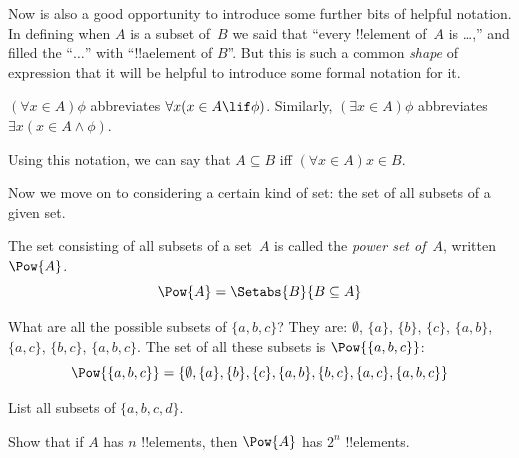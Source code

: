 \documentclass[../../../include/open-logic-section]{subfiles}
\begin{document}
Now is also a good opportunity to introduce some further bits of
helpful notation. In defining when $A$ is a subset of~$B$ we said that
``every !!{element} of~$A$ is \dots,'' and filled the ``$\dots$'' with
``!!a{element} of $B$''. But this is such a common \emph{shape} of
expression that it will be helpful to introduce some formal notation
for it.

\begin{defn}
$(\forall x \in A)\phi$ abbreviates $\forall x(x \in A \lif
\phi)$. Similarly, $(\exists x \in A)\phi$ abbreviates $\exists x(x
\in A \land \phi)$. 
\end{defn}

Using this notation, we can say that $A \subseteq B$ iff $(\forall
x \in A)x \in B$. 

Now we move on to considering a certain kind of set: the set of all
subsets of a given set. 

\begin{defn}
The set consisting of all subsets of a set~$A$ is called the
\emph{power set of}~$A$, written $\Pow{A}$.
  \[
    \Pow{A} = \Setabs{B}{B \subseteq A} 
  \]
\end{defn}

\begin{ex}
What are all the possible subsets of $\{ a, b, c \}$? They are:
$\emptyset$, $\{a \}$, $\{b\}$, $\{c\}$, $\{a, b\}$, $\{a, c\}$, $\{b,
c\}$, $\{a, b, c\}$. The set of all these subsets is
$\Pow{\{a,b,c\}}$:
\[
\Pow{\{ a, b, c \}} = \{\emptyset, \{a \}, \{b\}, \{c\}, \{a, b\},
\{b, c\}, \{a, c\}, \{a, b, c\}\}
\]
\end{ex}

\begin{prob}
List all subsets of $\{a, b, c, d\}$.
\end{prob}

\begin{prob}
Show that if $A$ has $n$ !!{element}s, then $\Pow{A}$ has $2^n$
!!{element}s.
\end{prob}
\end{document}
